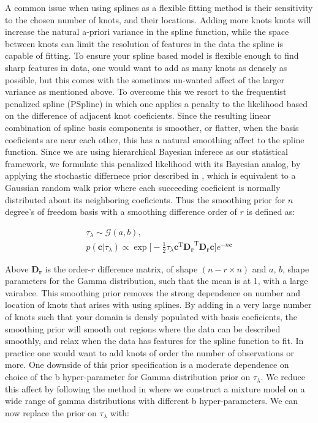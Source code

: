 A common issue when using splines as a flexible fitting method is their sensitivity to the chosen number of knots, and their locations. 
Adding more knots knots will increase the natural a-priori variance in the spline function, while the space between knots can limit the 
resolution of features in the data the spline is capable of fitting. To ensure your spline based model is flexible enough to find sharp
features in data, one would want to add as many knots as densely as possible, but this comes with the sometimes un-wanted affect of the 
larger variance as mentioned above. To overcome this we resort to the frequentist penalized spline (PSpline) in which one applies a penalty
to the likelihood based on the difference of adjacent knot coeficients. Since the resulting linear combination of spline basis components is 
smoother, or flatter, when the basis coeficients are near each other, this has a natural smoothing affect to the spline function. Since we are 
using hierarchical Bayesian inferece as our statistical framework, we formulate this penalized likelihood with its Bayesian analog, by applying 
the stochastic differnece prior described in , which is equivalent to a Gaussian random walk prior where each succeeding 
coeficient is normally distributed about its neighboring coeficients. Thus the smoothing prior for $n$ degree's of freedom basis with a smoothing 
difference order of $r$ is defined as:

\begin{eqnarray}
\tau_\lambda \sim \mathcal{G}(a, b), \\
p(\bm{c} | \tau_\lambda) \propto \exp \big[ -\frac{1}{2} \tau_\lambda \bm{c}^{\mathrm{T}} \bm{D_r}^{\mathrm{T}} \bm{D_r} \bm{c}  \big] e^{-n\bm{c}}
\end{eqnarray}

\noindent Above $\bm{D_r}$ is the order-$r$ difference matrix, of shape $(n-r \times n)$ and $a$, $b$, shape parameters for the Gamma distribution, such that
the mean is at 1, with a large vairabce. This smoothing prior removes the strong dependence on number and location of knots that arises with using splines. 
By adding in a very large number of knots such that your domain is densly populated with basis coeficients, the smoothing prior will smooth out regions where 
the data can be described smoothly, and relax when the data has features for the spline function to fit. In practice one would want to add knots 
of order the number of observations or more. One downside of this prior specification is a moderate dependence on choice of the b hyper-parameter for 
Gamma distribution prior on $\tau_\lambda$. We reduce this affect by following the method in  where we construct 
a mixture model on a wide range of gamma distributions with different b hyper-parameters. We can now replace the prior on $\tau_\lambda$ with:

